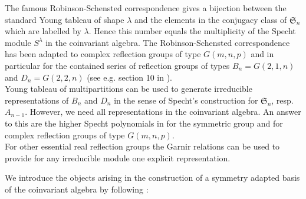 \documentclass[11pt,a4paper]{amsart}
\numberwithin{equation}{section}
\theoremstyle{definition}
\numberwithin{thm}{section}
\theoremstyle{break}
\numberwithin{subcase}{case}
\begin{document}
The famous Robinson-Schensted correspondence gives a bijection between the standard Young tableau of shape $\lambda$ and the elements in the conjugacy class of $\mathfrak{S}_n$ which are labelled by $\lambda$. Hence this number equals the multiplicity of the Specht module $S^{\lambda}$ in the coinvariant algebra. The Robinson-Schensted correspondence has been adapted to complex reflection groups of type $G(m,n,p)$ and in particular for the contained series of reflection groups of types $B_n=G(2,1,n)$ and $D_n=G(2,2,n)$ (see e.g. section 10 in \cite{caselli2011projective}). \\
Young tableau of multipartitions can be used to generate irreducible representations of $B_n$ and $D_n$ in the sense of Specht's construction \cite{specht} for $\mathfrak{S}_n$, resp. $A_{n-1}$. However, we need all representations in the coinvariant algebra. An answer to this are the higher Specht polynomials in \cite{ariki1997higher} for the symmetric group and \cite{morita1998higher} for complex reflection groups of type $G(m,n,p)$. \\
For other essential real reflection groups the Garnir relations can be used to provide for any irreducible module one explicit representation. 

We introduce the objects arising in the construction of a symmetry adapted basis of the coinvariant algebra by following \cite{ariki1997higher}:
\end{document}
